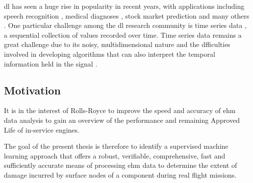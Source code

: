 \ac{dl} has seen a huge rise in popularity in recent years, with applications including speech recognition \cite{deng_machine_2013}, medical diagnoses \cite{lee_diagnosis_2018}, stock market prediction \cite{krollner_financial_2010} and many others \cite{kelleher_fundamentals_2015}. One particular challenge among the \ac{dl} research community is time series data \cite{yang_10_2006}, a sequential collection of values recorded over time. Time series data remains a great challenge due to its noisy, multidimensional nature \cite{kelleher_fundamentals_2015} and the dfficulties involved in developing algorithms that can also interpret the temporal information held in the signal \cite{bagnall_great_2017}. 

\subsection{Motivation}
It is in the interest of Rolls-Royce to improve the speed and accuracy of \ac{ehm} data analysis to gain an overview of the performance and remaining Approved Life of in-service engines. 

The goal of the present thesis is therefore to identify a supervised machine learning approach that offers a robust, verifiable, comprehensive, fast and sufficiently accurate means of processing \ac{ehm} data to determine the extent of damage incurred by surface nodes of a component during real flight missions. 